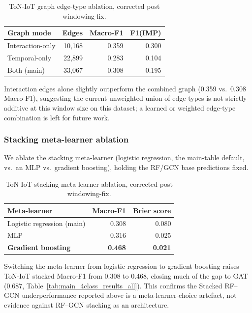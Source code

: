 \documentclass[pdflatex,sn-mathphys-num]{sn-jnl}
\theoremstyle{thmstyleone}%
\theoremstyle{thmstyletwo}%
\theoremstyle{thmstylethree}%
\begin{document}
\begin{table}[!t]
\centering
\caption{ToN-IoT graph edge-type ablation, corrected post windowing-fix.}
\label{tab:toniot_graph_ablation_corrected}
\begin{tabular}{lrrr}
\toprule
\textbf{Graph mode} & \textbf{Edges} & \textbf{Macro-F1} & \textbf{F1(IMP)} \\
\midrule
Interaction-only & 10{,}168 & 0.359 & 0.300 \\
Temporal-only    & 22{,}899 & 0.283 & 0.104 \\
Both (main)      & 33{,}067 & 0.308 & 0.195 \\
\bottomrule
\end{tabular}
\end{table}

Interaction edges alone slightly outperform the combined graph (0.359 vs.\ 0.308 Macro-F1), suggesting the current unweighted union of edge types is not strictly additive at this window size on this dataset; a learned or weighted edge-type combination is left for future work.

\subsubsection{Stacking meta-learner ablation}
\label{subsec:meta_learner_corrected}
We ablate the stacking meta-learner (logistic regression, the main-table default, vs.\ an MLP vs.\ gradient boosting), holding the RF/GCN base predictions fixed.

\begin{table}[!t]
\centering
\caption{ToN-IoT stacking meta-learner ablation, corrected post windowing-fix.}
\label{tab:toniot_meta_learner_corrected}
\begin{tabular}{lrr}
\toprule
\textbf{Meta-learner} & \textbf{Macro-F1} & \textbf{Brier score} \\
\midrule
Logistic regression (main) & 0.308 & 0.080 \\
MLP                         & 0.316 & 0.025 \\
\textbf{Gradient boosting}  & \textbf{0.468} & \textbf{0.021} \\
\bottomrule
\end{tabular}
\end{table}

Switching the meta-learner from logistic regression to gradient boosting raises ToN-IoT stacked Macro-F1 from 0.308 to 0.468, closing much of the gap to GAT (0.687, Table~\ref{tab:main_4class_results_all}). This confirms the Stacked RF--GCN underperformance reported above is a meta-learner-choice artefact, not evidence against RF--GCN stacking as an architecture.
\end{document}
